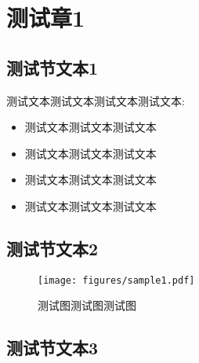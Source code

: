 \chapter{测试章1}

\section{测试节文本1} 

\zhlipsum[1]

测试文本测试文本测试文本测试文本:

\begin{itemize}[label={\checkmark}]
    \item 测试文本测试文本测试文本
    \item 测试文本测试文本测试文本
    \item 测试文本测试文本测试文本
    \item 测试文本测试文本测试文本
\end{itemize}


\section{测试节文本2}

\zhlipsum[2]

\begin{figure}[!htbp]
    \centering
    \texttt{[image: figures/sample1.pdf]}
    \caption{测试图测试图测试图}
    \label{fig:c01:sample1}
\end{figure}


\section{测试节文本3}
